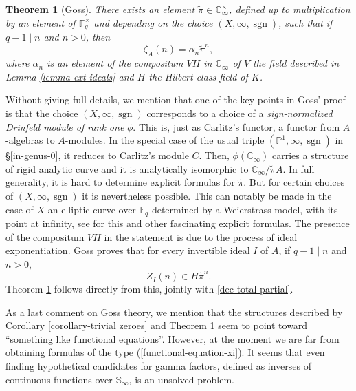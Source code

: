 \documentclass[11pt]{amsart}
\numberwithin{equation}{section}
\newcommand{\FF}{\mathbb{F}}
\newcommand{\CC}{\mathbb{C}}
\newcommand{\PP}{\mathbb{P}}
\newcommand{\sgn}{\operatorname{sgn}}
\newtheorem{Theorem}{Theorem}[section]
\newtheorem{Remark}[Theorem]{Remark}
\begin{document}
\begin{Theorem}[Goss]\label{Goss-formula-Euler}
There exists an element $\widetilde{\pi}\in\CC_\infty^\times$, defined up to multiplication by an element of $\FF_q^\times$ and depending on the choice $(X,\infty,\sgn)$, such that
if $q-1\mid n$ and $n>0$, then
$$\zeta_A(n)=\alpha_n\widetilde{\pi}^n,$$
where $\alpha_n$ is an element of the compositum $VH$ in $\CC_\infty$ of $V$ the field described in Lemma \ref{lemma-ext-ideals} and 
$H$ the Hilbert class field of $K$.
\end{Theorem} 

Without giving full details, we mention that one of the key points in Goss' proof is that the choice $(X,\infty,\sgn)$ corresponds to a choice of a {\em sign-normalized Drinfeld module of rank one} $\phi$. This is, just as Carlitz's functor, a functor from $A$-algebras to $A$-modules. In the special case of the usual triple $(\PP^1,\infty,\sgn)$ in \S \ref{in-genus-0}, it reduces to Carlitz's module $C$. Then, $\phi(\CC_\infty)$ carries a structure of rigid analytic curve and it is analytically isomorphic to
$\CC_\infty/\widetilde{\pi} A$. In full generality, it is hard to determine explicit formulas for $\widetilde{\pi}$. But for certain choices of $(X,\infty,\sgn)$ it is nevertheless possible. This can notably be made in the case of $X$ an elliptic curve over $\FF_q$ determined by 
a Weierstrass model, with its point at infinity, see \cite{GRE&PAP} for this and other fascinating explicit formulas. 
The presence of the compositum $VH$ in the statement is due to the process of ideal exponentiation. Goss proves that for every invertible ideal $I$ of $A$, if $q-1\mid n$ and $n>0$, \begin{equation}\label{partial-result-of-goss}Z_I(n)\in H\widetilde{\pi}^n.
\end{equation}
Theorem \ref{Goss-formula-Euler} follows directly from this, jointly with \eqref{dec-total-partial}.

As a last comment on Goss theory, we mention that the structures described by Corollary \ref{corollary-trivial zeroes} and Theorem \ref{Goss-formula-Euler} seem to point toward ``something like functional equations''. However, at the moment we are far from obtaining formulas of the type (\ref{functional-equation-xi}). It seems that even finding hypothetical candidates for gamma factors, defined as inverses of continuous functions over $\mathbb{S}_\infty$, is an unsolved problem. 

\end{document}
